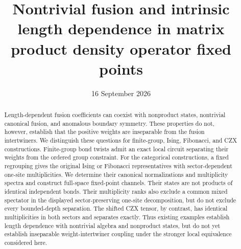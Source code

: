\documentclass[aps,pra,reprint,nofootinbib,onecolumn]{revtex4-2}
\begin{document}
\title{Nontrivial fusion and intrinsic length dependence in matrix product density operator fixed points}
\date{16 September 2026}

\begin{abstract}
	Length-dependent fusion coefficients can coexist with nonproduct states,
	nontrivial canonical fusion, and anomalous boundary symmetry. These
	properties do not, however, establish that the positive weights are
	inseparable from the fusion intertwiners. We distinguish these questions
	for finite-group, Ising, Fibonacci, and CZX constructions. Finite-group
	bond twists admit an exact local circuit separating their weights from
	the ordered group constraint. For the categorical constructions, a fixed
	regrouping gives the original Ising or Fibonacci representatives with
	sector-dependent one-site multiplicities. We determine their canonical
	normalizations and multiplicity spectra and construct full-space
	fixed-point channels. Their states are not products of identical
	independent bonds. Their multiplicity ranks also exclude a common mixed
	spectator in the displayed sector-preserving one-site decomposition,
	but do not exclude every bounded-depth separation. The shifted CZX
	tensor, by contrast, has identical multiplicities in both sectors and
	separates exactly. Thus existing examples establish length dependence
	with nontrivial algebra and nonproduct states, but do not yet establish
	inseparable weight-intertwiner coupling under the stronger local
	equivalence considered here.
\end{abstract}

\maketitle







\end{document}
